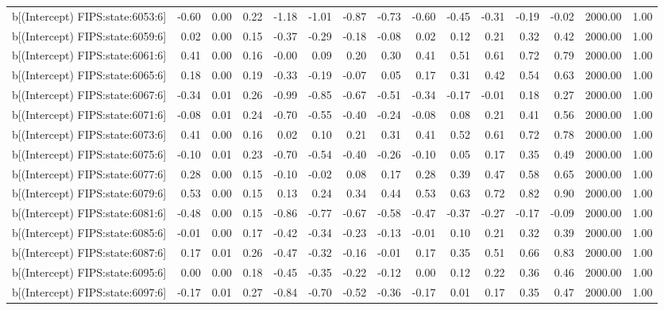 \begin{table}[ht]
\begin{tabular}{rrrrrrrrrrrrrrr}
  b[(Intercept) FIPS:state:6053:6] & -0.60 & 0.00 & 0.22 & -1.18 & -1.01 & -0.87 & -0.73 & -0.60 & -0.45 & -0.31 & -0.19 & -0.02 & 2000.00 & 1.00 \\ 
  b[(Intercept) FIPS:state:6059:6] & 0.02 & 0.00 & 0.15 & -0.37 & -0.29 & -0.18 & -0.08 & 0.02 & 0.12 & 0.21 & 0.32 & 0.42 & 2000.00 & 1.00 \\ 
  b[(Intercept) FIPS:state:6061:6] & 0.41 & 0.00 & 0.16 & -0.00 & 0.09 & 0.20 & 0.30 & 0.41 & 0.51 & 0.61 & 0.72 & 0.79 & 2000.00 & 1.00 \\ 
  b[(Intercept) FIPS:state:6065:6] & 0.18 & 0.00 & 0.19 & -0.33 & -0.19 & -0.07 & 0.05 & 0.17 & 0.31 & 0.42 & 0.54 & 0.63 & 2000.00 & 1.00 \\ 
  b[(Intercept) FIPS:state:6067:6] & -0.34 & 0.01 & 0.26 & -0.99 & -0.85 & -0.67 & -0.51 & -0.34 & -0.17 & -0.01 & 0.18 & 0.27 & 2000.00 & 1.00 \\ 
  b[(Intercept) FIPS:state:6071:6] & -0.08 & 0.01 & 0.24 & -0.70 & -0.55 & -0.40 & -0.24 & -0.08 & 0.08 & 0.21 & 0.41 & 0.56 & 2000.00 & 1.00 \\ 
  b[(Intercept) FIPS:state:6073:6] & 0.41 & 0.00 & 0.16 & 0.02 & 0.10 & 0.21 & 0.31 & 0.41 & 0.52 & 0.61 & 0.72 & 0.78 & 2000.00 & 1.00 \\ 
  b[(Intercept) FIPS:state:6075:6] & -0.10 & 0.01 & 0.23 & -0.70 & -0.54 & -0.40 & -0.26 & -0.10 & 0.05 & 0.17 & 0.35 & 0.49 & 2000.00 & 1.00 \\ 
  b[(Intercept) FIPS:state:6077:6] & 0.28 & 0.00 & 0.15 & -0.10 & -0.02 & 0.08 & 0.17 & 0.28 & 0.39 & 0.47 & 0.58 & 0.65 & 2000.00 & 1.00 \\ 
  b[(Intercept) FIPS:state:6079:6] & 0.53 & 0.00 & 0.15 & 0.13 & 0.24 & 0.34 & 0.44 & 0.53 & 0.63 & 0.72 & 0.82 & 0.90 & 2000.00 & 1.00 \\ 
  b[(Intercept) FIPS:state:6081:6] & -0.48 & 0.00 & 0.15 & -0.86 & -0.77 & -0.67 & -0.58 & -0.47 & -0.37 & -0.27 & -0.17 & -0.09 & 2000.00 & 1.00 \\ 
  b[(Intercept) FIPS:state:6085:6] & -0.01 & 0.00 & 0.17 & -0.42 & -0.34 & -0.23 & -0.13 & -0.01 & 0.10 & 0.21 & 0.32 & 0.39 & 2000.00 & 1.00 \\ 
  b[(Intercept) FIPS:state:6087:6] & 0.17 & 0.01 & 0.26 & -0.47 & -0.32 & -0.16 & -0.01 & 0.17 & 0.35 & 0.51 & 0.66 & 0.83 & 2000.00 & 1.00 \\ 
  b[(Intercept) FIPS:state:6095:6] & 0.00 & 0.00 & 0.18 & -0.45 & -0.35 & -0.22 & -0.12 & 0.00 & 0.12 & 0.22 & 0.36 & 0.46 & 2000.00 & 1.00 \\ 
  b[(Intercept) FIPS:state:6097:6] & -0.17 & 0.01 & 0.27 & -0.84 & -0.70 & -0.52 & -0.36 & -0.17 & 0.01 & 0.17 & 0.35 & 0.47 & 2000.00 & 1.00 \\ 

\end{tabular}
\end{table}
